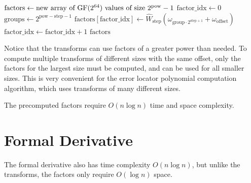 \begin{algorithm}[!hb]
    \begin{algorithmic}
            \State $\text{factors} \gets \text{new array of $\text{GF}(2^{64})$ values of size } 2^{\text{pow}} - 1$
            \State $\text{factor\_idx} \gets 0$
                \State $\text{groups} \gets 2^{\text{pow} - \text{step} - 1}$
                    \State $\text{factors}[\text{factor\_idx}] \gets \hat{W}_{\text{step}}(\omega_{\text{group} \cdot 2^{\text{step} + 1}} + \omega_{\text{offset}})$
                    \State $\text{factor\_idx} \gets \text{factor\_idx} + 1$
                \EndFor
            \EndFor
            \State \Return $\text{factors}$
        \EndFunction
    \end{algorithmic}
\end{algorithm}

Notice that the transforms can use factors of a greater power than needed. To compute multiple transforms of different sizes with the same offset, only the factors for the largest size must be computed, and can be used for all smaller sizes.
This is very convenient for the error locator polynomial computation algorithm, which uses transforms of many different sizes.

The precomputed factors require $O(n \log n)$ time and space complexity.

\section{Formal Derivative}
\label{appendix:derivative}

The formal derivative also has time complexity $O(n \log n)$, but unlike the transforms, the factors only require $O(\log n)$ space.

